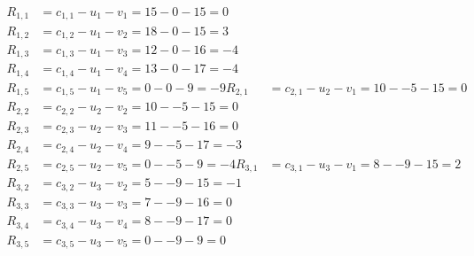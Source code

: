 \[
\begin{aligned}
R_{1,1} &= c_{1,1} - u_{1} - v_{1} = 15 - 0 - 15 = 0 \\
R_{1,2} &= c_{1,2} - u_{1} - v_{2} = 18 - 0 - 15 = 3 \\
R_{1,3} &= c_{1,3} - u_{1} - v_{3} = 12 - 0 - 16 = -4 \\
R_{1,4} &= c_{1,4} - u_{1} - v_{4} = 13 - 0 - 17 = -4 \\
R_{1,5} &= c_{1,5} - u_{1} - v_{5} = 0 - 0 - 9 = -9 
R_{2,1} &= c_{2,1} - u_{2} - v_{1} = 10 - -5 - 15 = 0 \\
R_{2,2} &= c_{2,2} - u_{2} - v_{2} = 10 - -5 - 15 = 0 \\
R_{2,3} &= c_{2,3} - u_{2} - v_{3} = 11 - -5 - 16 = 0 \\
R_{2,4} &= c_{2,4} - u_{2} - v_{4} = 9 - -5 - 17 = -3 \\
R_{2,5} &= c_{2,5} - u_{2} - v_{5} = 0 - -5 - 9 = -4 
R_{3,1} &= c_{3,1} - u_{3} - v_{1} = 8 - -9 - 15 = 2 \\
R_{3,2} &= c_{3,2} - u_{3} - v_{2} = 5 - -9 - 15 = -1 \\
R_{3,3} &= c_{3,3} - u_{3} - v_{3} = 7 - -9 - 16 = 0 \\
R_{3,4} &= c_{3,4} - u_{3} - v_{4} = 8 - -9 - 17 = 0 \\
R_{3,5} &= c_{3,5} - u_{3} - v_{5} = 0 - -9 - 9 = 0 
\end{aligned}
\]

